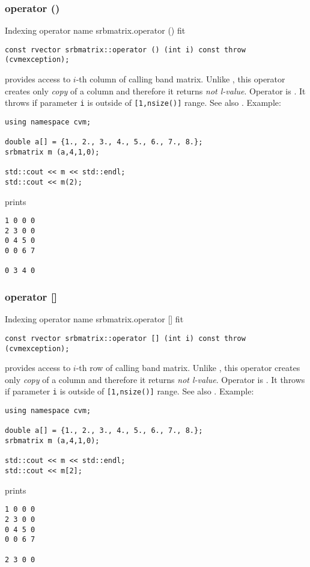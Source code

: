 \subsubsection{operator ()}
Indexing operator%
\pdfdest name {srbmatrix.operator ()} fit
\begin{verbatim}
const rvector srbmatrix::operator () (int i) const throw (cvmexception);
\end{verbatim}
provides access to \hbox{$i$-th} column of calling band matrix.
Unlike ,
this operator creates only \emph{copy} of a column 
and therefore it returns
\emph{not  l-value}.
Operator is \Based.
It throws 
if parameter \verb"i" is outside of \verb"[1,nsize()]" range.
See also .
Example:
\begin{Verbatim}
using namespace cvm;

double a[] = {1., 2., 3., 4., 5., 6., 7., 8.};
srbmatrix m (a,4,1,0);

std::cout << m << std::endl;
std::cout << m(2);
\end{Verbatim}
prints
\begin{Verbatim}
1 0 0 0
2 3 0 0
0 4 5 0
0 0 6 7

0 3 4 0
\end{Verbatim}
\newpage



\subsubsection{operator []}
Indexing operator%
\pdfdest name {srbmatrix.operator []} fit
\begin{verbatim}
const rvector srbmatrix::operator [] (int i) const throw (cvmexception);
\end{verbatim}
provides access to  \hbox{$i$-th} row of calling band matrix.
Unlike ,
this operator creates only  \emph{copy} of a column and therefore 
it returns
\emph{not  l-value}.
Operator is \Based.
It throws 
if  parameter \verb"i" is outside of \verb"[1,nsize()]" range.
See also .
Example:
\begin{Verbatim}
using namespace cvm;

double a[] = {1., 2., 3., 4., 5., 6., 7., 8.};
srbmatrix m (a,4,1,0);

std::cout << m << std::endl;
std::cout << m[2];
\end{Verbatim}
prints
\begin{Verbatim}
1 0 0 0
2 3 0 0
0 4 5 0
0 0 6 7

2 3 0 0
\end{Verbatim}
\newpage




